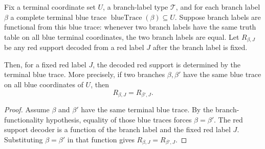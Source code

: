 \begin{helper}
Fix a terminal coordinate set \(U\), a branch-label type \(\mathcal T\), and
for each branch label \(\beta\) a complete terminal blue trace
\(\operatorname{blueTrace}(\beta)\subseteq U\).  Suppose branch labels are
functional from this blue trace: whenever two branch labels have the same
truth table on all blue terminal coordinates, the two branch labels are
equal.  Let \(R_{\beta,J}\) be any red support decoded from a red label
\(J\) after the branch label is fixed.

Then, for a fixed red label \(J\), the decoded red support is determined by
the terminal blue trace.  More precisely, if two branches \(\beta,\beta'\)
have the same blue trace on all blue coordinates of \(U\), then
\[
R_{\beta,J}=R_{\beta',J}.
\]
\end{helper}
\begin{proof}
Assume \(\beta\) and \(\beta'\) have the same terminal blue trace.  By the
branch-functionality hypothesis, equality of those blue traces forces
\(\beta=\beta'\).  The red support decoder is a function of the branch label
and the fixed red label \(J\).  Substituting \(\beta=\beta'\) in that
function gives \(R_{\beta,J}=R_{\beta',J}\).
\end{proof}
